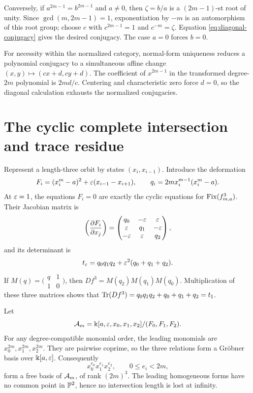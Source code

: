 \documentclass[11pt]{article}
\theoremstyle{definition}
\theoremstyle{remark}
\begin{document}
Conversely, if \(a^{2m-1}=b^{2m-1}\) and \(a\ne0\), then
\(\zeta=b/a\) is a \((2m-1)\)-st root of unity.  Since
\(\gcd(m,2m-1)=1\), exponentiation by \(-m\) is an automorphism of this
root group; choose \(c\) with \(c^{2m-1}=1\) and
\(c^{-m}=\zeta\).  Equation \eqref{eq:diagonal-conjugacy} gives the desired
conjugacy.  The case \(a=0\) forces \(b=0\).

For necessity within the normalized category, normal-form uniqueness reduces
a polynomial conjugacy to a simultaneous affine change
\((x,y)\mapsto(cx+d,cy+d)\).  The coefficient of \(x^{2m-1}\) in the
transformed degree-\(2m\) polynomial is \(2md/c\).  Centering and
characteristic zero force \(d=0\), so the diagonal calculation exhausts the
normalized conjugacies.

\section{The cyclic complete intersection and trace residue}
\label{sec:cyclic}

Represent a length-three orbit by states \((x_i,x_{i-1})\).  Introduce the
deformation
\begin{equation}
F_i=(x_i^m-a)^2+\varepsilon(x_{i-1}-x_{i+1}),
\qquad
q_i=2m x_i^{m-1}(x_i^m-a).
\label{eq:cyclic-system}
\end{equation}
At \(\varepsilon=1\), the equations \(F_i=0\) are exactly the cyclic equations for
\(\operatorname{Fix}(f_{m,a}^3)\).  Their Jacobian matrix is
\[
\left(\frac{\partial F_i}{\partial x_j}\right)
=
\begin{pmatrix}
q_0&-\varepsilon&\varepsilon\\
\varepsilon&q_1&-\varepsilon\\
-\varepsilon&\varepsilon&q_2
\end{pmatrix},
\]
and its determinant is
\begin{equation}
t_\varepsilon=q_0q_1q_2+\varepsilon^2(q_0+q_1+q_2).
\label{eq:t-epsilon}
\end{equation}
If \(M(q)=\bigl(\begin{smallmatrix}q&1\\1&0\end{smallmatrix}\bigr)\), then
\(Df^3=M(q_2)M(q_1)M(q_0)\).  Multiplication of these three matrices shows
that \(\operatorname{Tr}(Df^3)=q_0q_1q_2+q_0+q_1+q_2=t_1\).

Let
\begin{equation}
\mathcal{A}_m=
\Bbbk[a,\varepsilon,x_0,x_1,x_2]/(F_0,F_1,F_2).
\label{eq:cyclic-algebra}
\end{equation}
For any degree-compatible monomial order, the leading monomials are
\(x_0^{2m},x_1^{2m},x_2^{2m}\).  They are pairwise coprime, so the three
relations form a Gr\"obner basis over \(\Bbbk[a,\varepsilon]\).  Consequently
\[
x_0^{e_0}x_1^{e_1}x_2^{e_2},
\qquad 0\le e_i<2m,
\]
form a free basis of \(\mathcal{A}_m\), of rank \((2m)^3\).  The leading homogeneous
forms have no common point in \(\mathbb{P}^2\), hence no intersection length is lost
at infinity.
\end{document}
